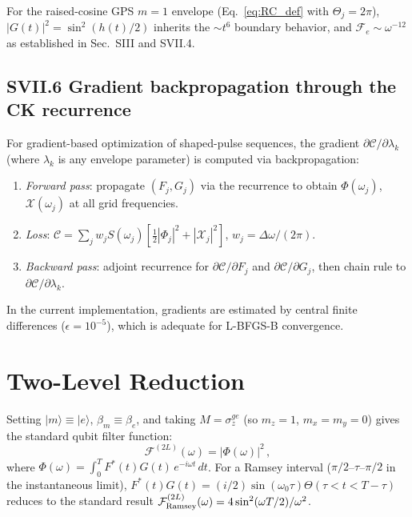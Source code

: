 \documentclass[aps,pra,twocolumn,superscriptaddress,longbibliography]{revtex4-2}
\newcommand{\be}{\begin{equation}}
\newcommand{\ee}{\end{equation}}
\begin{document}
       For the raised-cosine GPS $m=1$ envelope (Eq.~\eqref{eq:RC_def} with $\Theta_j=2\pi$),
       $|G(t)|^2=\sin^2(h(t)/2)$ inherits the $\sim t^6$ boundary behavior, and
       $\mathcal{F}_e\sim\omega^{-12}$ as established in Sec.~SIII and SVII.4.

       \subsection*{SVII.6 Gradient backpropagation through the CK recurrence}

       For gradient-based optimization of shaped-pulse sequences, the gradient
       $\partial\mathcal{C}/\partial\lambda_k$ (where $\lambda_k$ is any envelope parameter)       
       is computed via backpropagation:
       \begin{enumerate}
         \item \emph{Forward pass}: propagate $(F_j, G_j)$ via the recurrence to obtain
               $\Phi(\omega_j)$, $\mathcal{X}(\omega_j)$ at all grid frequencies.
         \item \emph{Loss}: $\mathcal{C} = \sum_j w_j S(\omega_j)[\tfrac{1}{2}|\Phi_j|^2 +
       |\mathcal{X}_j|^2]$,
               $w_j = \Delta\omega/(2\pi)$.
         \item \emph{Backward pass}: adjoint recurrence for $\partial\mathcal{C}/\partial F_j$     
               and $\partial\mathcal{C}/\partial G_j$, then chain rule to
       $\partial\mathcal{C}/\partial\lambda_k$.
       \end{enumerate}
       In the current implementation, gradients are estimated by central finite differences        
       ($\epsilon=10^{-5}$), which is adequate for L-BFGS-B convergence.


\section{Two-Level Reduction}
\label{supp:two_level_reduction}

Setting $|m\rangle \equiv |e\rangle$, $\beta_m \equiv \beta_e$, and taking
$M = \sigma_z^{ge}$ (so $m_z=1$, $m_x=m_y=0$) gives the standard qubit filter function:
\be
  \mathcal{F}^{(2L)}(\omega) = |\Phi(\omega)|^2\,,
\ee
where $\Phi(\omega) = \int_0^T F^*(t)G(t)\,e^{-i\omega t}\,dt$.
For a Ramsey interval ($\pi/2$--$\tau$--$\pi/2$ in the instantaneous limit),
$F^*(t)G(t) = (i/2)\sin(\omega_0\tau)\Theta(\tau<t<T-\tau)$ reduces to the standard result
$\mathcal{F}^{(2L)}_{\rm Ramsey}(\omega) = 4\sin^2(\omega T/2)/\omega^2$.
\end{document}
